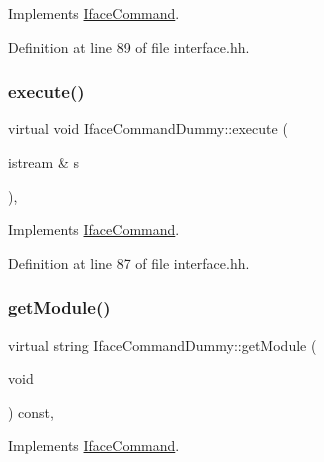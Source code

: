 Implements \mbox{\hyperlink{class_iface_command_a908e484baf6e090b46ceb2ccaea8139d}{Iface\+Command}}.



Definition at line 89 of file interface.\+hh.

\mbox{\label{class_iface_command_dummy_acac62af3353e7afe18ca6fd05b0d75fa}} 
\subsubsection{\texorpdfstring{execute()}{execute()}}
{\footnotesize\ttfamily virtual void Iface\+Command\+Dummy\+::execute (\begin{DoxyParamCaption}\item[{istream \&}]{s }\end{DoxyParamCaption})\hspace{0.3cm}{\ttfamily [inline]}, {\ttfamily [virtual]}}



Implements \mbox{\hyperlink{class_iface_command_af10e29cee2c8e419de6efe9e680ad201}{Iface\+Command}}.



Definition at line 87 of file interface.\+hh.

\mbox{\label{class_iface_command_dummy_ae7284da5e8726825621896c967b2d295}} 
\subsubsection{\texorpdfstring{getModule()}{getModule()}}
{\footnotesize\ttfamily virtual string Iface\+Command\+Dummy\+::get\+Module (\begin{DoxyParamCaption}\item[{void}]{ }\end{DoxyParamCaption}) const\hspace{0.3cm}{\ttfamily [inline]}, {\ttfamily [virtual]}}



Implements \mbox{\hyperlink{class_iface_command_a06f9500f4b0a0e3cf14010cf133502d5}{Iface\+Command}}.



